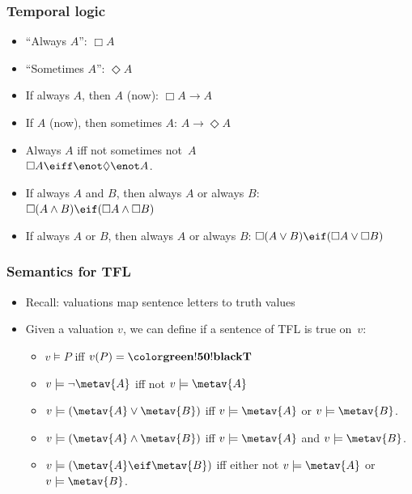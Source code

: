 \begin{frame}
\frametitle{Temporal logic}

\begin{itemize}[<+->]
  \item ``Always $A$'': $\Box A$
  \item ``Sometimes $A$'': $\Diamond A$
  \item If always $A$, then $A$ (now): $\Box A \to A$
  \item If $A$ (now), then sometimes $A$: $A \to \Diamond A$
  \item Always $A$ iff not sometimes not~$A$\\
  $\Box A \eiff \enot\Diamond \enot A$.
  \item If always $A$ and $B$, then always $A$ or always $B$:\\
  $\Box(A \land B) \eif (\Box A \land \Box B)$
  \item If always $A$ or $B$, then always $A$ or always $B$:
  $\Box(A \lor B) \eif (\Box A \lor \Box B)$
\end{itemize}
\end{frame}

\begin{frame}
\frametitle{Semantics for TFL}

\begin{itemize}[<+->]
  \item Recall: valuations map sentence letters to truth values
  \item Given a valuation $v$, we can define if a sentence of TFL is
  true on~$v$:
  \begin{itemize}
    \item $v \models P$ iff $v(P) = \True$
    \item $v \models \lnot \metav{A}$ iff not $v \models \metav{A}$
    \item $v \models (\metav{A} \lor \metav{B})$ iff $v \models
    \metav{A}$ or $v \models \metav{B}$.
    \item $v \models (\metav{A} \land \metav{B})$ iff $v \models
    \metav{A}$ and $v \models \metav{B}$.
    \item $v \models (\metav{A} \eif \metav{B})$ iff either not $v
    \models \metav{A}$ or $v \models \metav{B}$.
  \end{itemize}
\end{itemize}
\end{frame}

